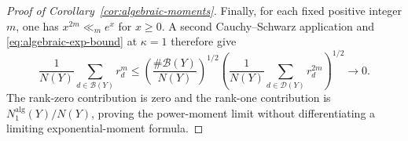 \begin{proof}[Proof of Corollary~\ref{cor:algebraic-moments}]
Finally, for each fixed positive integer \(m\), one has
\(x^{2m}\ll_m e^x\) for \(x\ge0\). A second Cauchy--Schwarz application
and \eqref{eq:algebraic-exp-bound} at \(\kappa=1\) therefore give
\[
 \frac1{N(Y)}\sum_{d\in\mathcal B(Y)}r_d^m
 \le
 \left(\frac{\#\mathcal B(Y)}{N(Y)}\right)^{1/2}
 \left(\frac1{N(Y)}\sum_{d\in\mathcal D(Y)}r_d^{2m}\right)^{1/2}
 \longrightarrow0.
\]
The rank-zero contribution is zero and the rank-one contribution is
\(N_1^{\mathrm{alg}}(Y)/N(Y)\), proving the power-moment limit without
differentiating a limiting exponential-moment formula.
\end{proof}
